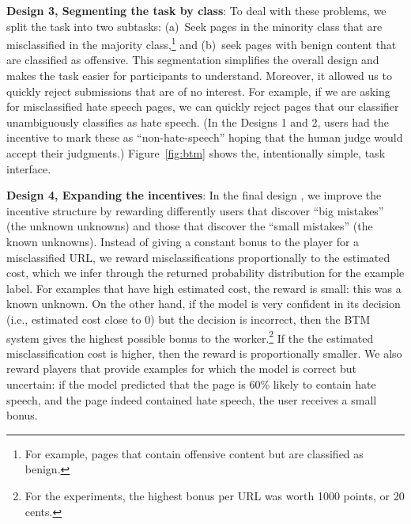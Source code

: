 \textbf{Design 3, Segmenting the task by class}: To deal with these problems, we split the task into two subtasks: (a)~Seek pages in the minority class that are misclassified in the majority class,\footnote{For example, pages that contain offensive content but are classified as benign.} and (b)~seek pages with benign content that are classified as offensive. This segmentation simplifies the overall design and makes the task easier for participants to understand.  Moreover, it allowed us to quickly reject submissions that are of no interest.  For example, if we are asking for misclassified hate speech pages, we can quickly reject pages that our classifier unambiguously classifies as hate speech. (In the Designs 1 and 2, users had the incentive to mark these as ``non-hate-speech'' hoping that the human judge would accept their judgments.) Figure~\ref{fig:btm} shows the, intentionally simple, task interface. 

\textbf{Design 4, Expanding the incentives}: In the final design , we improve the incentive structure by rewarding differently users that discover ``big mistakes'' (the unknown unknowns) and those that discover the ``small mistakes'' (the known unknowns). Instead of giving a constant bonus to the player for a misclassified URL, we reward misclassifications proportionally to the estimated cost, which we infer through the returned probability distribution for the example label.  
For examples that have high estimated cost, the reward is small: this was a known unknown.
On the other hand, if the model is very confident in its decision (i.e., estimated cost close to 0) but the decision is incorrect, then the BTM system gives the highest possible bonus to the worker.\footnote{For the experiments, the highest bonus per URL was worth 1000 points, or 20 cents.} If the the estimated misclassification cost is higher, then the reward is proportionally smaller. We also reward players that provide examples for which the model is correct but uncertain: if the model predicted that the page is 60\% likely to contain hate speech, and the page indeed contained hate speech, the user receives a small bonus.
